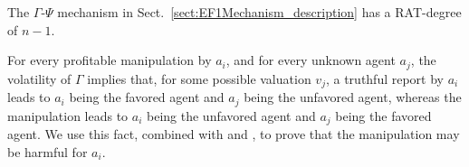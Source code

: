 \begin{theoremrep}\label{thm:gamma-psi-indivisible}
    The $\Gamma$-$\Psi$ mechanism in Sect.~\ref{sect:EF1Mechanism_description} has a RAT-degree of $n-1$.
\end{theoremrep}
\begin{proofsketch}
    For every profitable manipulation by $a_i$, and for every unknown agent $a_j$, the volatility of $\Gamma$ implies that, for some possible valuation $v_j$, 
    a truthful report by $a_i$ leads to $a_i$ being the favored agent and $a_j$ being the unfavored agent, whereas the manipulation leads to 
    $a_i$ being the unfavored agent and $a_j$ being the favored agent. We use this fact, combined with  and , to prove that the manipulation may be harmful for $a_i$.
\end{proofsketch}
